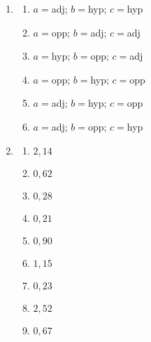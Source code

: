  \begin{solutions}{}{
\begin{enumerate}[itemsep=5pt, label=\textbf{\arabic*}. ] 


\item %
\begin{multicols}{2}
\begin{enumerate}[noitemsep, label=\textbf{(\alph*)} ]
\item $a=$adj; $b=$hyp; $c=$hyp
\item $a=$opp; $b=$adj; $c=$adj
\item $a=$hyp; $b=$opp; $c=$adj
\item $a=$opp; $b=$hyp; $c=$opp
\item $a=$adj; $b=$hyp; $c=$opp
\item $a=$adj; $b=$opp; $c=$hyp
\end{enumerate}
\end{multicols}
\item %
\begin{multicols}{2}
\begin{enumerate}[noitemsep, label=\textbf{(\alph*)} ]
\item $2,14$%
\item $0,62$%
\item $0,28$%
\item $0,21$%
\item $0,90$%
\item $1,15$%
\item $0,23$%
\item $2,52$%
\item $0,67$%
\end{enumerate}


\end{multicols}
\end{enumerate}}
\end{solutions}
